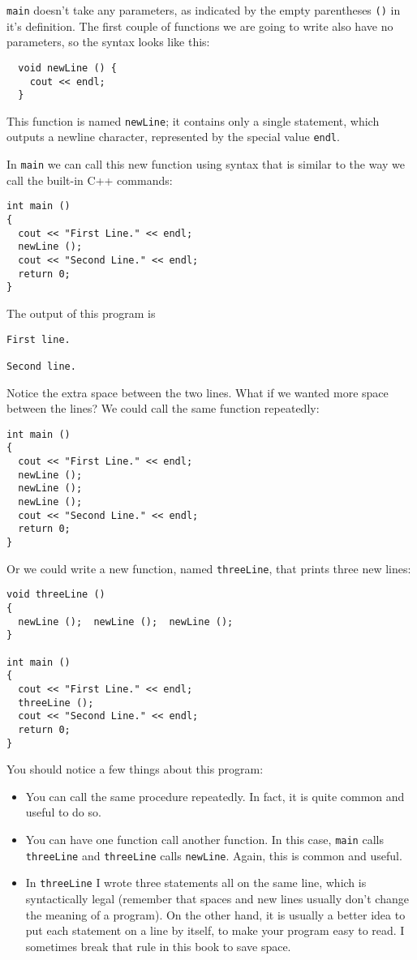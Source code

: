 {\tt main} doesn't take any parameters, as indicated by
the empty parentheses {\tt ()} in it's definition.  The first couple
of functions we are going to write also have no parameters, so the
syntax looks like this:

\begin{lstlisting}
  void newLine () {
    cout << endl;
  }
\end{lstlisting}
%
This function is named {\tt newLine}; it contains only a single
statement, which outputs a newline character, represented by
the special value {\tt endl}.

In {\tt main} we can call this new function using syntax that
is similar to the way we call the built-in C++ commands:

\begin{lstlisting}
int main ()
{
  cout << "First Line." << endl;
  newLine ();
  cout << "Second Line." << endl;
  return 0;
}
\end{lstlisting}
%
The output of this program is

\begin{lstlisting}
First line.

Second line.
\end{lstlisting}
%
Notice the extra space between the two lines.  What if we wanted
more space between the lines?  We could call the same
function repeatedly:

\begin{lstlisting}
int main ()
{
  cout << "First Line." << endl;
  newLine ();
  newLine ();
  newLine ();
  cout << "Second Line." << endl;
  return 0;
}
\end{lstlisting}
%
Or we could write a new function, named {\tt threeLine}, that 
prints three new lines:

\begin{lstlisting}
void threeLine ()
{
  newLine ();  newLine ();  newLine ();
}

int main ()
{
  cout << "First Line." << endl;
  threeLine ();
  cout << "Second Line." << endl;
  return 0;
}
\end{lstlisting}
%
You should notice a few things about this program:

\begin{itemize}

\item You can call the same procedure repeatedly.  In
fact, it is quite common and useful to do so.

\item You can have one function call another function.  In this
case, {\tt main} calls {\tt threeLine} and {\tt threeLine}
calls {\tt newLine}.  Again, this is common and useful.

\item In {\tt threeLine} I wrote three statements all on the
same line, which is syntactically legal (remember that spaces
and new lines usually don't change the meaning of a program).
On the other hand, it is usually a better idea to put each
statement on a line by itself, to make your program easy to
read.  I sometimes break that rule in this book to save space.

\end{itemize}

